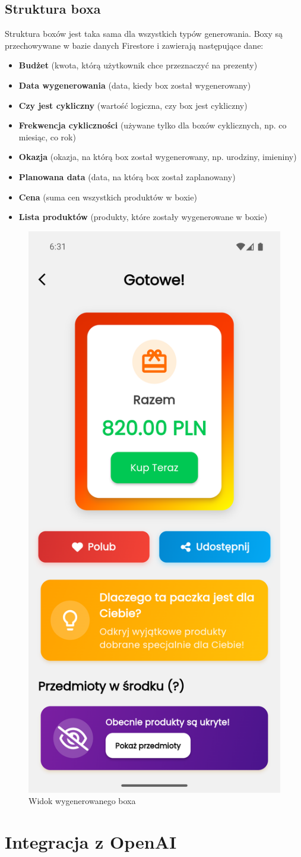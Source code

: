 \documentclass[a4paper, 12pt]{article}
\begin{document}
\subsection{Struktura boxa}
Struktura boxów jest taka sama dla wszystkich typów generowania. Boxy są przechowywane w bazie danych Firestore i zawierają następujące dane:
\begin{itemize}
    \item \textbf{Budżet} (kwota, którą użytkownik chce przeznaczyć na prezenty)
    \item \textbf{Data wygenerowania} (data, kiedy box został wygenerowany)
    \item \textbf{Czy jest cykliczny} (wartość logiczna, czy box jest cykliczny)
    \item \textbf{Frekwencja cykliczności} (używane tylko dla boxów cyklicznych, np. co miesiąc, co rok)
    \item \textbf{Okazja} (okazja, na którą box został wygenerowany, np. urodziny, imieniny)
    \item \textbf{Planowana data} (data, na którą box został zaplanowany)
    \item \textbf{Cena} (suma cen wszystkich produktów w boxie)
    \item \textbf{Lista produktów} (produkty, które zostały wygenerowane w boxie)
\end{itemize}
\begin{figure}[H]
    \centering
    \includegraphics[width=0.3\linewidth,keepaspectratio]{images/box_summary.png}
    \caption{Widok wygenerowanego boxa}
    \label{fig:box-summary}
\end{figure}
\newpage
\section{Integracja z OpenAI}
\end{document}
